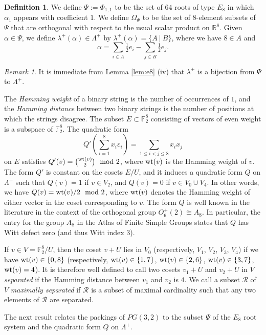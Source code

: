 \documentclass{amsart}
\theoremstyle{plain}
\theoremstyle{definition}
\newtheorem{defn}[theorem]{Definition}
\theoremstyle{remark}
\newtheorem{rmk}[theorem]{Remark}
\numberwithin{equation}{section}
\newcommand{\al}{\alpha}
\newcommand{\ep}{\varepsilon}
\newcommand{\R}{{\mathbb R}}
\newcommand{\F}{{\mathbb F}}
\newcommand{\allroots}{\Phi}
\newcommand{\calr}{\mathcal{R}}
\newcommand{\wt}{\text{\rm wt}}
\newcommand{\qp}{\Omega}
\newcommand{\lamp}{\Lambda^+}
\newcommand{\slp}{\lambda^+}
\begin{document}
\begin{defn}\label{def:psi}
We define $\Psi := \allroots_{1, 1}$ to be the set of $64$ roots of type $E_8$ in which $\al_1$ appears with 
coefficient $1$. We define $\qp_\Psi$ to be the set of $8$-element subsets of $\Psi$ that are orthogonal with respect 
to the usual scalar product on $\R^8$.
Given $\al \in \Psi$, we define $\slp(\al) \in \lamp$ by $\slp(\al) = \{A \ |\  B \}$, where we have $8 \in A$ and $$
\al = \sum_{i \in A} \tfrac{1}{2}e_i - \sum_{j \in B} \tfrac{1}{2}e_j
.$$
\end{defn}

\begin{rmk}\label{rmk:slp}
It is immediate from Lemma \ref{lem:e8} (iv) that $\slp$ is a bijection from $\Psi$ to $\lamp$.
\end{rmk}

The {\it Hamming weight} of a binary string is the number of occurrences of $1$, and the {\it Hamming distance}
between two binary strings is the number of positions at which the strings disagree. The subset $E \subset \F_2^8$ 
consisting of vectors of even weight is a subspace of $\F_2^8$.
The quadratic form $$
Q'\left(\sum_{i = 1}^8 x_i \ep_i\right) = \sum_{1 \leq i < j \leq 8} x_i x_j
$$ on $E$ satisfies $Q'(v) = \binom{\wt(v)}{2} \mod 2$, where $\wt(v)$ is the Hamming weight of $v$. 
The form $Q'$ is constant on the cosets $E/U$, and it induces a quadratic form $Q$ on $\lamp$ such that $Q(v) = 1$ if 
$v \in V_2$, and $Q(v) = 0$ if $v \in V_0 \cup V_4$. In
other words, we have $Q(v) = \wt(v)/2 \mod 2$, where $\wt(v)$ denotes the Hamming weight of either vector in the coset
corresponding to $v$. The form $Q$ is well known in the literature in the context of the orthogonal group 
$O_6^+(2) \cong A_8$. In particular, the entry for the group $A_8$ in the Atlas of Finite Simple Groups \cite{conway85}
states that $Q$ has Witt defect zero (and thus Witt index $3$).

If $v \in V = \F_2^8/U$, then the coset $v + U$ lies in $V_0$ (respectively, $V_1$, $V_2$, $V_3$, 
$V_4$) if we have $\wt(v) \in \{0, 8\}$ (respectively, $\wt(v) \in \{1, 7\}$, $\wt(v) \in \{2, 6\}$, 
$\wt(v) \in \{3, 7\}$, $\wt(v) = 4$). It is therefore well defined to call two cosets $v_1 + U$ and $v_2 + U$ in $V$ 
{\it separated} if the Hamming distance between $v_1$ and $v_2$ is $4$. We call a subset $\calr$ of $V$ {\it maximally 
separated} if $\calr$ is a subset of maximal cardinality such that any two elements of $\calr$ are separated.

The next result relates the packings of $PG(3, 2)$ to the subset $\Psi$ of the $E_8$ root system and 
the quadratic form $Q$ on $\lamp$. 
\end{document}
